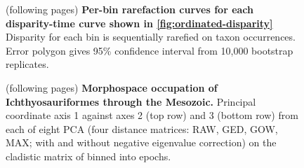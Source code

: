 \documentclass[british,a4paper]{article}
\begin{document}


\begin{figure}[h]
    \caption[Per-bin rarefaction curves for each disparity-time curve shown in
    \cref{fig:ordinated-disparity}]{(following pages) \textbf{Per-bin
    rarefaction curves for each disparity-time curve shown in
    \cref{fig:ordinated-disparity}} Disparity for each bin is sequentially
    rarefied on taxon occurrences. Error polygon gives 95\% confidence interval from
    10,000 bootstrap replicates.\label{fig:rarefaction-curves}}
\end{figure}
\FloatBarrier


\FloatBarrier

\begin{figure}[h]
    \caption[Morphospace occupation of Ichthyosauriformes through the
    Mesozoic]{(following pages) \textbf{Morphospace occupation of
    Ichthyosauriformes through the Mesozoic.} Principal coordinate axis 1
    against axes 2 (top row) and 3 (bottom row) from each of eight PCA (four
    distance matrices: RAW, GED, GOW, MAX\@; with and without negative eigenvalue
    correction) on the cladistic matrix of \textcite{Moon2018JSP} binned into
    epochs.\label{fig:morphospace-plots}}
\end{figure}
\FloatBarrier


\end{document}

